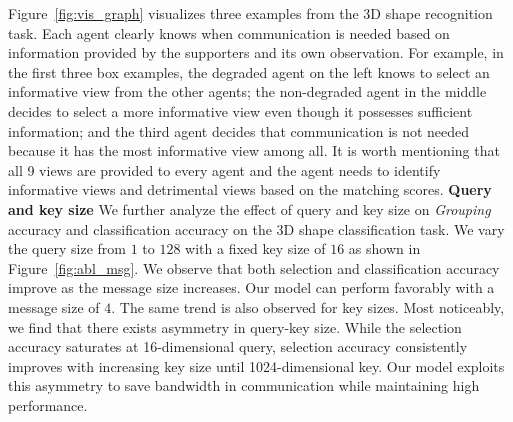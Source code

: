 Figure~\ref{fig:vis_graph} visualizes three examples from the 3D shape recognition task. Each agent clearly knows when communication is needed based on information provided by the supporters and its own observation. For example, in the first three box examples, the degraded agent on the left knows to select an informative view from the other agents; the non-degraded agent in the middle decides to select a more informative view even though it possesses sufficient information; and the third agent decides that communication is not needed because it has the most informative view among all. It is worth mentioning that all 9 views are provided to every agent and the agent needs to identify informative views and detrimental views based on the matching scores. 
\noindent
\textbf{Query and key size}
We further analyze the effect of query and key size on \textit{Grouping} accuracy and classification accuracy on the 3D shape classification task. 
We vary the query size from $1$ to $128$ with a fixed key size of $16$ as shown in Figure~\ref{fig:abl_msg}. We observe that both selection and classification accuracy improve as the message size increases. Our model can perform favorably with a message size of $4$. The same trend is also observed for key sizes. Most noticeably, we find that there exists asymmetry in query-key size. While the selection accuracy saturates at 16-dimensional query, selection accuracy consistently improves with increasing key size until 1024-dimensional key. Our model exploits this asymmetry to save bandwidth in communication while maintaining high performance.  
